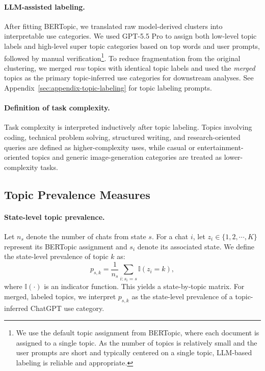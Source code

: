 \documentclass[11pt]{article}
\begin{document}
\paragraph{LLM-assisted labeling.} After fitting BERTopic, we translated raw model-derived clusters into interpretable use categories. We used GPT-5.5 Pro to assign both low-level topic labels and high-level super topic categories based on top words and user prompts, followed by manual verification\footnote{We use the default topic assignment from BERTopic, where each document is assigned to a single topic. As the number of topics is relatively small and the user prompts are short and typically centered on a single topic, LLM-based labeling is reliable and appropriate.}. To reduce fragmentation from the original clustering, we merged \emph{raw} topics with identical topic labels and used the \emph{merged} topics as the primary topic-inferred use categories for downstream analyses. See Appendix~\ref{sec:appendix-topic-labeling} for topic labeling prompts.

\paragraph{Definition of task complexity.} Task complexity is interpreted inductively after topic labeling. Topics involving coding, technical problem solving, structured writing, and research-oriented queries are defined as higher-complexity uses, while casual or entertainment-oriented topics and generic image-generation categories are treated as lower-complexity tasks. 

\subsection{Topic Prevalence Measures}
\paragraph{State-level topic prevalence.}
Let $n_s$ denote the number of chats from state $s$. For a chat $i$, let $z_i \in \{1,2,\cdots,K\}$ represent its BERTopic assignment and $s_i$ denote its associated state. We define the state-level prevalence of topic $k$ as:
\begin{equation}
  p_{s,k} = \frac{1}{n_s} \sum_{i: s_i=s} \mathbb{I}(z_i = k),
  \label{eq:topic_prop}
\end{equation}
where $\mathbb{I}(\cdot)$ is an indicator function. This yields a state-by-topic matrix. For merged, labeled topics, we interpret $p_{s,k}$ as the state-level prevalence of a topic-inferred ChatGPT use category.
\end{document}
